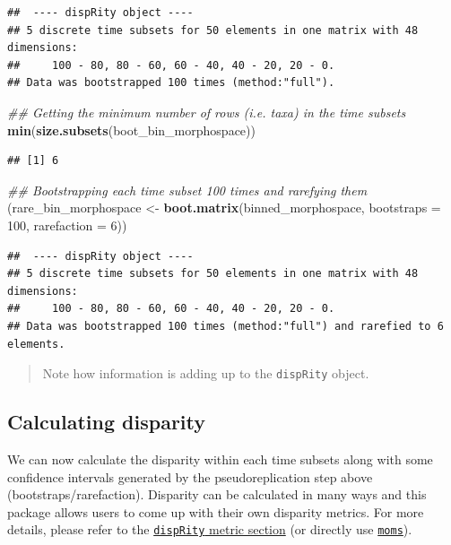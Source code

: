 \documentclass[]{book}
\newenvironment{Shaded}{\begin{snugshade}}{\end{snugshade}}
\newcommand{\CommentTok}[1]{\textcolor[rgb]{0.56,0.35,0.01}{\textit{#1}}}
\newcommand{\DataTypeTok}[1]{\textcolor[rgb]{0.13,0.29,0.53}{#1}}
\newcommand{\DecValTok}[1]{\textcolor[rgb]{0.00,0.00,0.81}{#1}}
\newcommand{\KeywordTok}[1]{\textcolor[rgb]{0.13,0.29,0.53}{\textbf{#1}}}
\newcommand{\NormalTok}[1]{#1}
\newcommand{\StringTok}[1]{\textcolor[rgb]{0.31,0.60,0.02}{#1}}
\begin{document}
\begin{verbatim}
##  ---- dispRity object ---- 
## 5 discrete time subsets for 50 elements in one matrix with 48 dimensions:
##     100 - 80, 80 - 60, 60 - 40, 40 - 20, 20 - 0.
## Data was bootstrapped 100 times (method:"full").
\end{verbatim}

\begin{Shaded}
\begin{Highlighting}[]
\CommentTok{## Getting the minimum number of rows (i.e. taxa) in the time subsets}
\KeywordTok{min}\NormalTok{(}\KeywordTok{size.subsets}\NormalTok{(boot_bin_morphospace))}
\end{Highlighting}
\end{Shaded}

\begin{verbatim}
## [1] 6
\end{verbatim}

\begin{Shaded}
\begin{Highlighting}[]
\CommentTok{## Bootstrapping each time subset 100 times and rarefying them }
\NormalTok{(rare_bin_morphospace <-}\StringTok{ }\KeywordTok{boot.matrix}\NormalTok{(binned_morphospace, }\DataTypeTok{bootstraps =} \DecValTok{100}\NormalTok{,}
    \DataTypeTok{rarefaction =} \DecValTok{6}\NormalTok{))}
\end{Highlighting}
\end{Shaded}

\begin{verbatim}
##  ---- dispRity object ---- 
## 5 discrete time subsets for 50 elements in one matrix with 48 dimensions:
##     100 - 80, 80 - 60, 60 - 40, 40 - 20, 20 - 0.
## Data was bootstrapped 100 times (method:"full") and rarefied to 6 elements.
\end{verbatim}

\begin{quote}
Note how information is adding up to the \texttt{dispRity} object.
\end{quote}

\hypertarget{calculating-disparity-1}{%
\subsection{Calculating disparity}\label{calculating-disparity-1}}

We can now calculate the disparity within each time subsets along with some confidence intervals generated by the pseudoreplication step above (bootstraps/rarefaction).
Disparity can be calculated in many ways and this package allows users to come up with their own disparity metrics.
For more details, please refer to the \protect\hyperlink{disparity-metrics}{\texttt{dispRity} metric section} (or directly use \href{https://tguillerme.shinyapps.io/moms/}{\texttt{moms}}).
\end{document}
